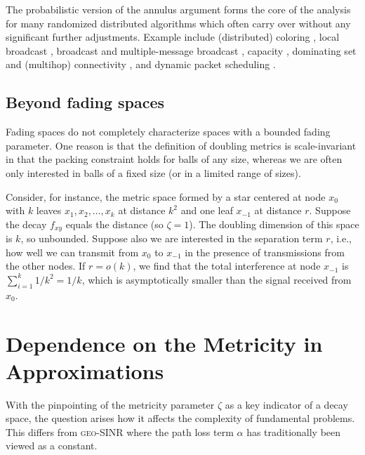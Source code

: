 \documentclass[11pt]{amsart}
\newcommand{\geomodel}{\textsc{geo-SINR}}
\begin{document}
The probabilistic version of the annulus argument forms the core of
the analysis for many randomized distributed algorithms which often carry over without any significant further adjustments.
Example include (distributed) coloring \cite{YWHLa11}, local broadcast
\cite{Goussevskaia2008Local, Yu11, Yu12, FOMC12}, broadcast
\cite{DaumGKN13} and multiple-message broadcast \cite{YuHWTL12,
  YuHWYL13}, capacity \cite{pei2013distributed}, 
dominating set \cite{ScheidelerRS08} and (multihop) connectivity  \cite{PODC12, PODC13}, and dynamic packet scheduling \cite{pei2012low}.







\subsection{Beyond fading spaces}
Fading spaces do not completely characterize spaces with a
bounded fading parameter. One reason is that the definition of
doubling metrics is scale-invariant in that the packing
constraint holds for balls of any size, whereas we are often only
interested in balls of a fixed size (or in a limited range of sizes).

Consider, for instance, the metric space formed by a star centered at
node $x_0$ with $k$ leaves $x_1, x_2, \ldots, x_{k}$ at distance 
$k^2$ and one leaf $x_{-1}$ at distance $r$.  Suppose the
decay $f_{xy}$ equals the distance (so $\zeta=1$).  The doubling
dimension of this space is $k$, so unbounded.  Suppose also we are
interested in the separation term $r$, i.e., how well we can transmit
from $x_0$ to $x_{-1}$ in the presence of transmissions from the other
nodes. If $r=o(k)$, we find that the total interference at node
$x_{-1}$ is $\sum_{i=1}^k 1/k^2 = 1/k$, which is asymptotically
smaller than the signal received from $x_{0}$.



\section{Dependence on the Metricity in Approximations}
\label{sec:dependence}

With the pinpointing of the metricity parameter $\zeta$ as a key 
indicator of a decay space, the question
arises how it affects the complexity of fundamental problems. 
This differs from {\geomodel} where the path loss term
$\alpha$ has traditionally been viewed as a constant.
\end{document}
